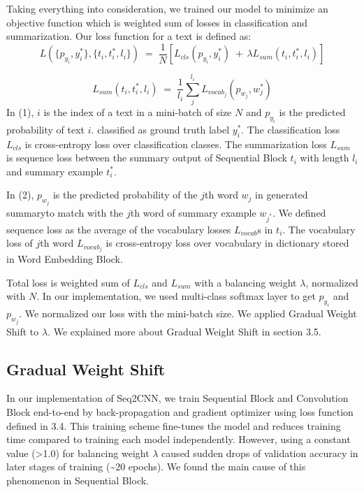 \documentclass{article}
\begin{document}
Taking everything into consideration, we trained our model to minimize an objective function which is weighted sum of losses in classification and summarization. Our loss function for a text is defined as: 
\begin{equation}
L(\{p_{y_i},y_i^{*}\},\{t_i,t_i^*,l_i\})\; = \; \frac{1}{N}\left [ L_{cls}(p_{y_i},y_i^{*})\; +\, \lambda L_{sum}(t_i,t_i^*,l_i) \right ]
\end{equation}

\begin{equation}
L_{sum}(t_i,t_i^*,l_i)\; = \; \frac{1}{l_{i}}\sum_{j}^{l_{i}}L_{vocab_j}(p_{w_j},w_j^*)
\end{equation}
In (1), $i$ is the index of a text in a mini-batch of size $N$ and $p_{y_i}$ is the predicted probability of text $i$. classified as ground truth label $y_i^*$. The classification loss $L_{cls}$ is cross-entropy loss over classification classes. The summarization loss $L_{sum}$ is sequence loss between the summary output of Sequential Block $t_i$ with length $l_i$ and summary example $t_i^*$. 

In (2), $p_{w_j}$ is the predicted probability of the $j$th word $w_j$ in generated summaryto match with the $j$th word of summary example $w_{j^*}$. We defined sequence loss as the average of the vocabulary losses $L_{vocab}$s in $t_i$. The vocabulary loss of $j$th word $L_{vocab_j}$ is cross-entropy loss over vocabulary in dictionary stored in Word Embedding Block. 

Total loss is weighted sum of $L_{cls}$ and $L_{sum}$ with a balancing weight $\lambda$, normalized with $N$. In our implementation, we used multi-class softmax layer to get $p_{y_i}$ and $p_{w_j}$. We normalized our loss with the mini-batch size. We applied Gradual Weight Shift to $\lambda$. We explained more about Gradual Weight Shift in section 3.5. 

\subsection{Gradual Weight Shift}
In our implementation of Seq2CNN, we train Sequential Block and Convolution Block end-to-end by back-propagation and gradient optimizer using loss function defined in 3.4. This training scheme fine-tunes the model and reduces training time compared to training each model independently. However, using a constant value (\textgreater1.0) for balancing weight $\lambda$ caused sudden drops of validation accuracy in later stages of training (\textasciitilde20 epochs). We found the main cause of this phenomenon in Sequential Block.
\end{document}
